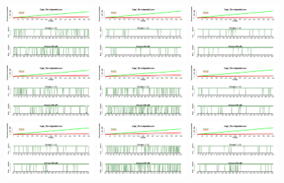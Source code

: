 \documentclass[a4paper ]{article}
\begin{document}
\begin{figure}[th]
\centering
\includegraphics[width=0.3\textwidth]{Figures/Success_Exp1_P1} \includegraphics[width=0.3\textwidth]{Figures/Success_Exp1_P2} \includegraphics[width=0.3\textwidth]{Figures/Success_Exp1_P3}
\includegraphics[width=0.3\textwidth]{Figures/Success_Exp1_P4} \includegraphics[width=0.3\textwidth]{Figures/Success_Exp1_P5} \includegraphics[width=0.3\textwidth]{Figures/Success_Exp1_P6}
\includegraphics[width=0.3\textwidth]{Figures/Success_Exp1_P7} \includegraphics[width=0.3\textwidth]{Figures/Success_Exp1_P8} \includegraphics[width=0.3\textwidth]{Figures/Success_Exp1_P9}

\end{figure}
\end{document}
